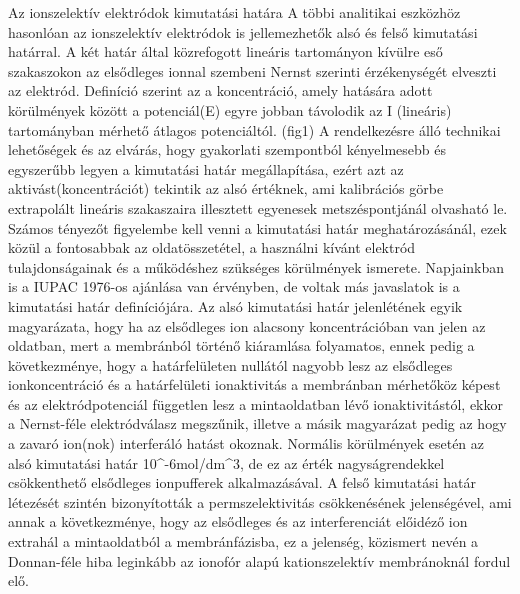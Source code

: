Az ionszelektív elektródok kimutatási határa
A többi analitikai eszközhöz hasonlóan az ionszelektív elektródok is jellemezhetők alsó és felső kimutatási határral. A két határ által közrefogott lineáris tartományon kívülre eső szakaszokon az elsődleges ionnal szembeni Nernst szerinti érzékenységét elveszti az elektród. 
 Definíció szerint az a koncentráció, amely hatására adott körülmények között a potenciál(E) egyre jobban távolodik az I (lineáris) tartományban mérhető átlagos potenciáltól. (fig1) A rendelkezésre álló technikai lehetőségek és az elvárás, hogy gyakorlati szempontból kényelmesebb és egyszerűbb legyen a kimutatási határ megállapítása, ezért azt az aktivást(koncentrációt) tekintik az alsó értéknek, ami kalibrációs görbe extrapolált lineáris szakaszaira illesztett egyenesek metszéspontjánál olvasható le. Számos tényezőt figyelembe kell venni a kimutatási határ meghatározásánál, ezek közül a fontosabbak az oldatösszetétel, a használni kívánt elektród tulajdonságainak és a működéshez szükséges körülmények ismerete. 
 Napjainkban is a IUPAC 1976-os ajánlása van érvényben, de voltak más javaslatok is a kimutatási határ definíciójára. 
Az alsó kimutatási határ jelenlétének egyik magyarázata, hogy ha az elsődleges ion alacsony koncentrációban van jelen az oldatban, mert a membránból történő kiáramlása folyamatos, ennek pedig a következménye, hogy a határfelületen nullától nagyobb lesz az elsődleges ionkoncentráció és a határfelületi ionaktivitás a membránban mérhetőköz képest és az elektródpotenciál független lesz a mintaoldatban lévő ionaktivitástól, ekkor a Nernst-féle elektródválasz megszűnik, illetve a másik magyarázat pedig az hogy a zavaró ion(nok) interferáló hatást okoznak. Normális körülmények esetén az alsó kimutatási határ 10^-6mol/dm^3, de ez az érték nagyságrendekkel csökkenthető elsődleges ionpufferek alkalmazásával.
A felső kimutatási határ létezését szintén bizonyították a permszelektivitás csökkenésének jelenségével, ami annak a következménye, hogy az elsődleges és az interferenciát előidéző ion extrahál a mintaoldatból a membránfázisba, ez a jelenség, közismert nevén a Donnan-féle hiba leginkább az ionofór alapú kationszelektív membránoknál fordul elő. 


